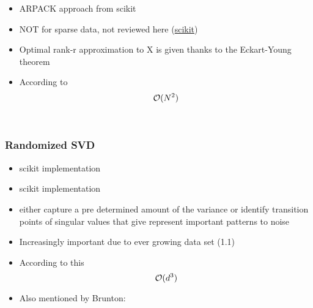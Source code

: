 \begin{itemize}
	\item \cite{wright2001large} ARPACK approach from scikit
	\item NOT for sparse data, not reviewed here (\href{https://scikit-learn.org/stable/modules/generated/sklearn.decomposition.PCA.html}{scikit})
	\item Optimal rank-r approximation to X is given thanks to the Eckart-Young theorem \cite{eckart1936approximation}
	\item According to \cite{wright2001large, brunton2019data}
	$$\mathcal{O}(N^2)$$

\end{itemize}

\ \clearpage
\ \clearpage


\subsubsection{Randomized SVD}

\begin{itemize}
	\item \cite{halko2011finding} scikit implementation
	\item \cite{martinsson2011randomized} scikit implementation
	\item \cite{brunton2019data} either capture a pre determined amount of the variance or identify transition points of singular values that give represent important patterns to noise
	\item Increasingly important due to ever growing data set \cite{brunton2019data} (1.1)
	\item According to this \cite{HandsOnMLCh8}
	$$\mathcal{O}(d^3)$$
	\item Also mentioned by Brunton: \cite{sarlos2006improved}
\end{itemize}

\ \clearpage
\ \clearpage

